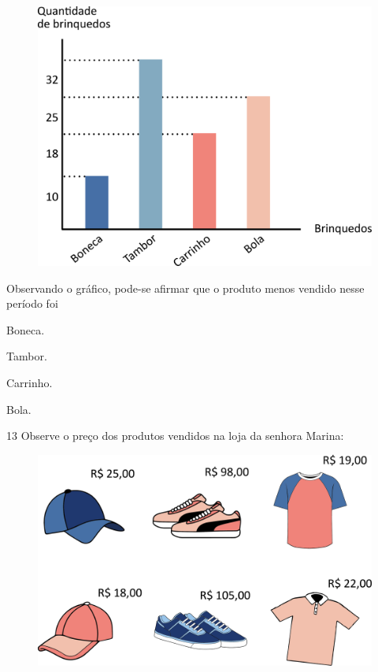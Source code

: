 \begin{figure}[htpb!]
\centering
\includegraphics[width=\textwidth]{./media/image119.png}
\end{figure}

Observando o gráfico, pode-se afirmar que o produto menos vendido nesse período foi

\begin{escolha}
\item
  Boneca.
\item
  Tambor.
\item
  Carrinho.
\item
  Bola.
\end{escolha}

\pagebreak
\num{13} Observe o preço dos produtos vendidos na loja da senhora Marina:

\begin{figure}[htpb!]
\centering
\includegraphics[width=\textwidth]{./media/image120.png}
\end{figure}

